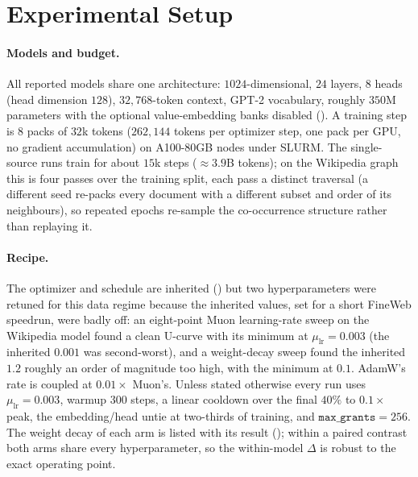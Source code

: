 \section{Experimental Setup}
\label{sec:experiments}

\paragraph{Models and budget.}
All reported models share one architecture: $1024$-dimensional, $24$ layers, $8$ heads
(head dimension $128$), $32{,}768$-token context, GPT-2 vocabulary, roughly $350$M
parameters with the optional value-embedding banks disabled (). A
training step is $8$ packs of $32$k tokens ($262{,}144$ tokens per optimizer step,
one pack per GPU, no gradient accumulation) on A100-80GB nodes under SLURM. The
single-source runs train for about $15$k steps ($\approx3.9$B tokens); on the
Wikipedia graph this is four passes over the training split, each pass a distinct
traversal (a different seed re-packs every document with a different subset and
order of its neighbours), so repeated epochs re-sample the co-occurrence structure
rather than replaying it.

\paragraph{Recipe.}
The optimizer and schedule are inherited () but two hyperparameters
were retuned for this data regime because the inherited values, set for a short
FineWeb speedrun, were badly off: an eight-point Muon learning-rate sweep on the
\doccausal Wikipedia model found a clean U-curve with its minimum at
$\mu_\text{lr}=0.003$ (the inherited $0.001$ was second-worst), and a weight-decay
sweep found the inherited $1.2$ roughly an order of magnitude too high, with the
minimum at $0.1$. AdamW's rate is coupled at $0.01\times$ Muon's. Unless stated
otherwise every run uses $\mu_\text{lr}=0.003$, warmup $300$ steps, a linear cooldown
over the final $40\%$ to $0.1\times$ peak, the embedding/head untie at two-thirds of
training, and $\texttt{max\_grants}=256$. The weight decay of each arm is listed with
its result (); within a paired contrast both arms share every
hyperparameter, so the within-model $\Delta$ is robust to the exact operating point.

